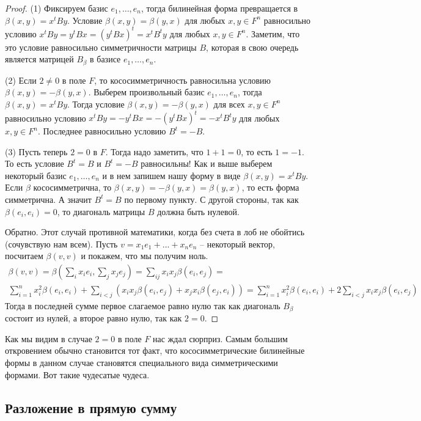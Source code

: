 \begin{proof}
(1) Фиксируем базис $e_1,\ldots,e_n$, тогда билинейная форма превращается в $\beta(x,y) = x^t B y$.
Условие $\beta(x,y) = \beta(y,x)$ для любых $x,y\in F^n$ равносильно условию $x^t B y = y^t B x = (y^t B x)^t = x^t B^t y$ для любых $x,y\in F^n$.
Заметим, что это условие равносильно симметричности матрицы $B$, которая в свою очередь является матрицей $B_\beta$ в базисе $e_1,\ldots,e_n$.

(2) Если $2\neq 0$ в поле $F$, то кососимметричность равносильна условию $\beta(x,y) = -\beta(y,x)$.
Выберем произвольный базис $e_1,\ldots,e_n$, тогда $\beta(x,y) = x^t By$.
Тогда условие $\beta(x,y) = -\beta(y,x)$ для всех $x,y\in F^n$ равносильно условию $x^t By = -y^t Bx = -(y^t B x)^t =- x^t B^t y$ для любых $x,y\in F^n$.
Последнее равносильно условию $B^t = - B$.

(3) Пусть теперь $2 = 0$ в $F$.
Тогда надо заметить, что $1 + 1 = 0$, то есть $1 = - 1$.
То есть условие $B^t = B$ и $B^t = - B$ равносильны!
Как и выше выберем некоторый базис $e_1,\ldots,e_n$ и в нем запишем нашу форму в виде $\beta(x,y) = x^t B y$.
Если $\beta$ кососимметрична, то $\beta(x,y) = -\beta(y,x) = \beta(y,x)$, то есть форма симметрична.
А значит $B^t = B$ по первому пункту.
С другой стороны, так как $\beta(e_i,e_i) = 0$, то диагональ матрицы $B$ должна быть нулевой.

Обратно.
Этот случай противной математики, когда без счета в лоб не обойтись (сочувствую нам всем).
Пусть $v = x_1e_1+\ldots+x_ne_n$ -- некоторый вектор, посчитаем $\beta(v,v)$ и покажем, что мы получим ноль.
\begin{gather*}
\beta(v,v) = \beta(\sum_i x_i e_i, \sum_j x_j e_j) = \sum_{ij}x_ix_j \beta(e_i,e_j) =\\ \sum_{i=1}^nx_i^2 \beta(e_i, e_i) + \sum_{i<j}(x_i x_j \beta(e_i, e_j) + x_j x_i \beta(e_j, e_i)) = \sum_{i=1}^nx_i^2 \beta(e_i, e_i) + 2\sum_{i<j}x_i x_j \beta(e_i, e_j)
\end{gather*}
Тогда в последней сумме первое слагаемое равно нулю так как диагональ $B_\beta$ состоит из нулей, а второе равно нулю, так как $2 = 0$.
\end{proof}

Как мы видим в случае $2 = 0$ в поле $F$ нас ждал сюрприз.
Самым большим откровением обычно становится тот факт, что кососимметрические билинейные формы в данном случае становятся специального вида симметрическими формами.
Вот такие чудесатые чудеса.


\subsection{Разложение в прямую сумму}

